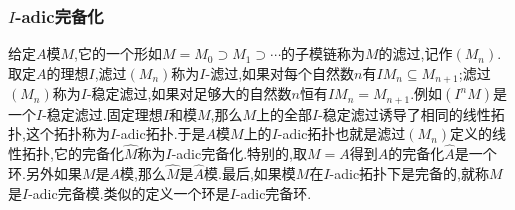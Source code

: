 \subsubsection{$I$-adic完备化}

给定$A$模$M$,它的一个形如$M=M_0\supset M_1\supset\cdots$的子模链称为$M$的滤过,记作$(M_n)$.取定$A$的理想$I$,滤过$(M_n)$称为$I$-滤过,如果对每个自然数$n$有$IM_n\subseteq M_{n+1}$;滤过$(M_n)$称为$I$-稳定滤过,如果对足够大的自然数$n$恒有$IM_n=M_{n+1}$.例如$(I^nM)$是一个$I$-稳定滤过.固定理想$I$和模$M$,那么$M$上的全部$I$-稳定滤过诱导了相同的线性拓扑,这个拓扑称为$I$-adic拓扑.于是$A$模$M$上的$I$-adic拓扑也就是滤过$(M_n)$定义的线性拓扑,它的完备化$\widehat{M}$称为$I$-adic完备化.特别的,取$M=A$得到$A$的完备化$\widehat{A}$是一个环.另外如果$M$是$A$模,那么$\widehat{M}$是$\widehat{A}$模.最后,如果模$M$在$I$-adic拓扑下是完备的,就称$M$是$I$-adic完备模.类似的定义一个环是$I$-adic完备环.

